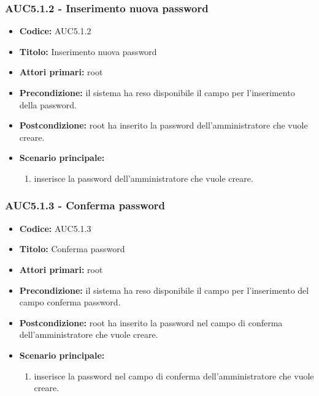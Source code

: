 \documentclass[casi-duso]{subfiles}
\begin{document}
\subsubsection{AUC5.1.2 - Inserimento nuova password}%
\label{subsub:AUC5.1.2}
\begin{itemize}
  \item \textbf{Codice:} AUC5.1.2
  \item \textbf{Titolo:} Inserimento nuova password
  \item \textbf{Attori primari:} root
  \item \textbf{Precondizione:} il sistema ha reso disponibile il campo per l'inserimento della password.
  \item \textbf{Postcondizione:} root ha inserito la password dell'amministratore che vuole creare.
  \item \textbf{Scenario principale:}
  \begin{enumerate}
    \item {} inserisce la password dell'amministratore che vuole creare.
  \end{enumerate}
\end{itemize}

\subsubsection{AUC5.1.3 - Conferma password}%
\label{subsub:AUC5.1.3}
\begin{itemize}
  \item \textbf{Codice:} AUC5.1.3
  \item \textbf{Titolo:} Conferma password
  \item \textbf{Attori primari:} root
  \item \textbf{Precondizione:} il sistema ha reso disponibile il campo per l'inserimento del campo conferma password.
  \item \textbf{Postcondizione:} root ha inserito la password nel campo di conferma dell'amministratore che vuole creare.
  \item \textbf{Scenario principale:}
  \begin{enumerate}
    \item {} inserisce la password nel campo di conferma dell'amministratore che vuole creare.
  \end{enumerate}
\end{itemize}
\end{document}
